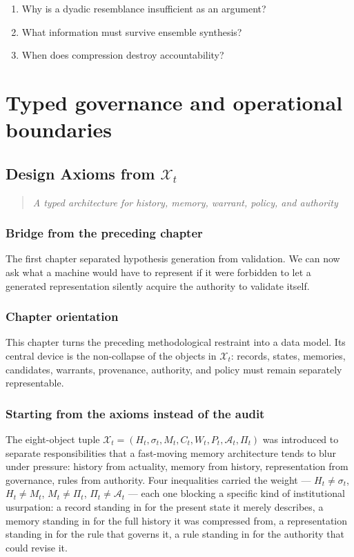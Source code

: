 \documentclass[11pt,openany]{book}
\newcommand{\chapterprecis}[1]{\begin{quote}\itshape #1\end{quote}}
\begin{document}
\begin{enumerate}

\item Why is a dyadic resemblance insufficient as an argument?

\item What information must survive ensemble synthesis?

\item When does compression destroy accountability?

\end{enumerate}

\part{Typed governance and operational boundaries}

\chapter{Design Axioms from $\mathcal{X}_t$}

\chapterprecis{A typed architecture for history, memory, warrant, policy, and authority}

\section*{Bridge from the preceding chapter}

The first chapter separated hypothesis generation from validation. We can now ask what a machine would have to represent if it were forbidden to let a generated representation silently acquire the authority to validate itself.

\section*{Chapter orientation}

This chapter turns the preceding methodological restraint into a data model. Its central device is the non-collapse of the objects in $\mathcal{X}_t$: records, states, memories, candidates, warrants, provenance, authority, and policy must remain separately representable.

\section{Starting from the axioms instead of the audit}

The eight-object tuple $\mathcal{X}_t = (H_t, \sigma_t, M_t, C_t, W_t, P_t, \mathcal{A}_t, \Pi_t)$ was introduced to separate responsibilities that a fast-moving memory architecture tends to blur under pressure: history from actuality, memory from history, representation from governance, rules from authority. Four inequalities carried the weight — $H_t \neq \sigma_t$, $H_t \neq M_t$, $M_t \neq \Pi_t$, $\Pi_t \neq \mathcal{A}_t$ — each one blocking a specific kind of institutional usurpation: a record standing in for the present state it merely describes, a memory standing in for the full history it was compressed from, a representation standing in for the rule that governs it, a rule standing in for the authority that could revise it.
\end{document}
